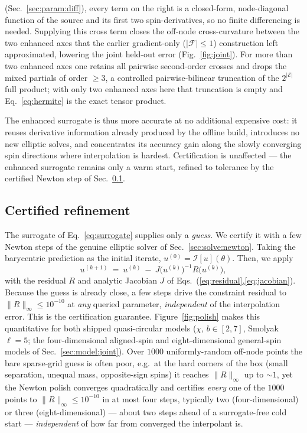 \documentclass[
  aps,
  prd,
  twocolumn,
  amsmath,
  amssymb,
  nofootinbib,
  superscriptaddress,
  floatfix,
]{revtex4-2}
\begin{document}
(Sec.~\ref{sec:param:diff}), every term on the right is a closed-form, node-diagonal
function of the source and its first two spin-derivatives, so no finite differencing
is needed. Supplying this cross term closes the off-node cross-curvature between the
two enhanced axes that the earlier gradient-only ($|\mathcal{F}|\le1$) construction
left approximated, lowering the joint held-out error (Fig.~\ref{fig:joint}). For more
than two enhanced axes one retains all pairwise second-order crosses and drops the
mixed partials of order $\ge3$, a controlled pairwise-bilinear truncation of the
$2^{|\mathcal{E}|}$ full product; with only two enhanced axes here that truncation is
empty and Eq.~\eqref{eq:hermite} is the exact tensor product.

The enhanced surrogate is thus more accurate at no additional expensive cost: it
reuses derivative information already produced by the offline build, introduces no
new elliptic solves, and concentrates its accuracy gain along the slowly converging
spin directions where interpolation is hardest. Certification is unaffected --- the
enhanced surrogate remains only a warm start, refined to tolerance by the certified
Newton step of Sec.~\ref{sec:polish}.

\subsection{Certified refinement}
\label{sec:polish}
The surrogate of Eq.~\eqref{eq:surrogate} supplies only a
\emph{guess}. We certify it with a few Newton steps of the genuine elliptic
solver of Sec.~\ref{sec:solve:newton}. Taking the barycentric prediction as the
initial iterate, $u^{(0)} = \mathcal{I}[u](\theta)$. Then, we apply
\begin{equation}
  u^{(k+1)} \ = \ u^{(k)} \ - \  J\bigl(u^{(k)}\bigr)^{-1} R\bigl(u^{(k)}\bigr),
  \label{eq:polish}
\end{equation}
with the residual $R$ and analytic Jacobian $J$ of
Eqs.~(\ref{eq:residual},\ref{eq:jacobian}). Because the guess is already close,
a few steps drive the constraint residual to $\|R\|_\infty \le 10^{-10}$
at \emph{any} queried parameter,
\emph{independent} of the interpolation error. This is the certification guarantee.
{\color{red}Figure~\ref{fig:polish} makes this quantitative for both shipped
quasi-circular models ($\chi$, $b\in[2,7]$, Smolyak $\ell=5$; the four-dimensional
aligned-spin and eight-dimensional general-spin models of
Sec.~\ref{sec:model:joint}).
Over $1000$ uniformly-random off-node points the bare sparse-grid guess is often
poor, e.g.\ at the hard corners of the box (small separation, unequal mass,
opposite-sign spins) it reaches $\|R\|_\infty$ up to $\sim\!1$, yet the Newton
polish converges quadratically and certifies \emph{every} one of the $1000$ points
to $\|R\|_\infty\le10^{-10}$ in at most four steps, typically two (four-dimensional)
or three (eight-dimensional) --- about two steps ahead of a surrogate-free cold
start --- \emph{independent} of how far from converged the interpolant is.}
\end{document}
